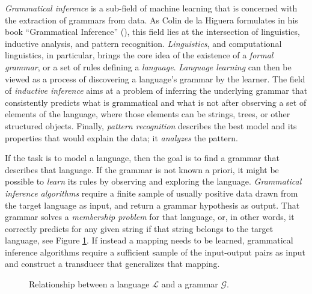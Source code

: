 \emph{Grammatical inference} is a sub-field of machine learning 
that is concerned with the extraction of grammars from data.
As Colin de la Higuera formulates in his book ``Grammatical Inference'' (\citeyear{DeLaHiguera2010}), this field lies at the intersection of linguistics, inductive analysis, and pattern recognition.
\emph{Linguistics}, and computational linguistics, in particular, brings the core idea of the existence of a \emph{formal grammar}, or a set of rules defining a \emph{language}.
\emph{Language learning} can then be viewed as a process of discovering a language's grammar by the learner.
The field of \emph{inductive inference} aims at a problem of inferring the underlying grammar that consistently predicts what is grammatical and what is not after observing a set of elements of the language, where those elements can be strings, trees, or other structured objects.
Finally, \emph{pattern recognition} describes the best model and its properties that would explain the data; it \emph{analyzes} the pattern.

If the task is to model a language, then the goal is to find a grammar that describes that language.
If the grammar is not known a priori, it might be possible to \emph{learn} its rules by observing and exploring the language.
\emph{Grammatical inference algorithms} require a finite sample of usually positive data drawn from the target language as input, and return a grammar hypothesis as output.
That grammar solves a \emph{membership problem} for that language, or, in other words, it correctly predicts for any given string if that string belongs to the target language, see Figure \ref{fig:LGrel}.
If instead a mapping needs to be learned, grammatical inference algorithms require a sufficient sample of the input-output pairs as input and construct a transducer that generalizes that mapping.

\begin{figure}[t]
  \centering
  \caption{Relationship between a language $\mathcal{L}$ and a grammar $\mathcal{G}$.}
  \label{fig:LGrel}
\end{figure}


